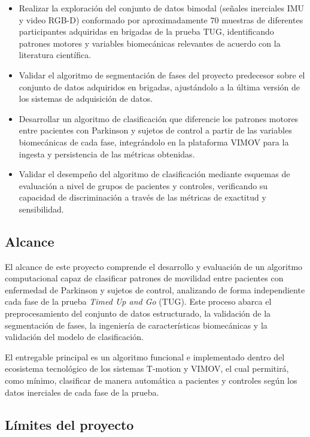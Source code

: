 \documentclass[12pt,a4paper]{article}
\begin{document}
\begin{itemize}[itemsep=4pt]
  \item Realizar la exploración del conjunto de datos bimodal (señales inerciales IMU y video RGB-D) conformado por aproximadamente 70 muestras de diferentes participantes adquiridas en brigadas de la prueba TUG, identificando patrones motores y variables biomecánicas relevantes de acuerdo con la literatura científica.
  \item Validar el algoritmo de segmentación de fases del proyecto predecesor sobre el conjunto de datos adquiridos en brigadas, ajustándolo a la última versión de los sistemas de adquisición de datos.
  \item Desarrollar un algoritmo de clasificación que diferencie los patrones motores entre pacientes con Parkinson y sujetos de control a partir de las variables biomecánicas de cada fase, integrándolo en la plataforma VIMOV para la ingesta y persistencia de las métricas obtenidas.
  \item Validar el desempeño del algoritmo de clasificación mediante esquemas de evaluación a nivel de grupos de pacientes y controles, verificando su capacidad de discriminación a través de las métricas de exactitud y sensibilidad.
\end{itemize}

\subsection{Alcance}\label{sec:alcance}

El alcance de este proyecto comprende el desarrollo y evaluación de un algoritmo computacional capaz de clasificar patrones de movilidad entre pacientes con enfermedad de Parkinson y sujetos de control, analizando de forma independiente cada fase de la prueba \emph{Timed Up and Go} (TUG). Este proceso abarca el preprocesamiento del conjunto de datos estructurado, la validación de la segmentación de fases, la ingeniería de características biomecánicas y la validación del modelo de clasificación.

El entregable principal es un algoritmo funcional e implementado dentro del ecosistema tecnológico de los sistemas T-motion y VIMOV, el cual permitirá, como mínimo, clasificar de manera automática a pacientes y controles según los datos inerciales de cada fase de la prueba.

\subsection{Límites del proyecto}\label{sec:limites}
\end{document}
